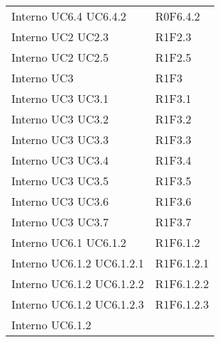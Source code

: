 \begin{longtable}{p{2.5cm}!{\VRule[1pt]}p{2.5cm}}
Interno \newline UC6.4
 \newline UC6.4.2
 & R0F6.4.2 \\
Interno \newline UC2
 \newline UC2.3
 & R1F2.3 \\
Interno \newline UC2
 \newline UC2.5
 & R1F2.5 \\
Interno \newline UC3
 & R1F3 \\
Interno \newline UC3
 \newline UC3.1
 & R1F3.1 \\
Interno \newline UC3
 \newline UC3.2
 & R1F3.2 \\
Interno \newline UC3
 \newline UC3.3
 & R1F3.3 \\
Interno \newline UC3
 \newline UC3.4
 & R1F3.4 \\
Interno \newline UC3
 \newline UC3.5
 & R1F3.5 \\
Interno \newline UC3
 \newline UC3.6
 & R1F3.6 \\
Interno \newline UC3
 \newline UC3.7
 & R1F3.7 \\
Interno \newline UC6.1
 \newline UC6.1.2
 & R1F6.1.2 \\
Interno \newline UC6.1.2
 \newline UC6.1.2.1
 & R1F6.1.2.1 \\
Interno \newline UC6.1.2
 \newline UC6.1.2.2
 & R1F6.1.2.2 \\
Interno \newline UC6.1.2
 \newline UC6.1.2.3
 & R1F6.1.2.3 \\
Interno \newline UC6.1.2

\end{longtable}
